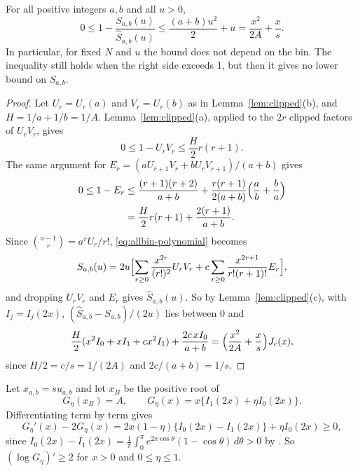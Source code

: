 \begin{theorem}\label{thm:allbin-bessel}
For all positive integers $a,b$ and all $u>0$,
\begin{equation}\label{eq:allbin-bessel}
 0\le 1-\frac{S_{a,b}(u)}{\widehat S_{a,b}(u)}
 \le \frac{(a+b)u^2}{2}+u
 =\frac{x^2}{2A}+\frac xs.
\end{equation}
In particular, for fixed $N$ and $u$ the bound does not depend on the bin.
The inequality still holds when the right side exceeds 1, but then it
gives no lower bound on $S_{a,b}$.
\end{theorem}
\begin{proof}
Let $U_r=U_r(a)$ and $V_r=U_r(b)$ as in Lemma~\ref{lem:clipped}(b), and
$H=1/a+1/b=1/A$. Lemma~\ref{lem:clipped}(a), applied to the $2r$ clipped
factors of $U_rV_r$, gives
\begin{equation}\label{eq:allbin-odd-deficit}
 0\le1-U_rV_r\le\frac H2r(r+1).
\end{equation}
The same argument for $E_r=(aU_{r+1}V_r+bU_rV_{r+1})/(a+b)$ gives
\begin{align}
 0\le1-E_r
 &\le\frac{(r+1)(r+2)}{a+b}
 +\frac{r(r+1)}{2(a+b)}\Bigl(\frac ab+\frac ba\Bigr)\notag\\
 &=\frac H2r(r+1)+\frac{2(r+1)}{a+b}.\label{eq:allbin-even-deficit}
\end{align}
Since $\binom{a-1}r=a^rU_r/r!$, \eqref{eq:allbin-polynomial} becomes
\begin{equation}\label{eq:allbin-normalized-series}
 S_{a,b}(u)=2u\Bigl[
 \sum_{r\ge0}\frac{x^{2r}}{(r!)^2}U_rV_r
 +c\sum_{r\ge0}\frac{x^{2r+1}}{r!(r+1)!}E_r\Bigr],
\end{equation}
and dropping $U_rV_r$ and $E_r$ gives $\widehat S_{a,b}(u)$. So by
Lemma~\ref{lem:clipped}(c), with $I_j=I_j(2x)$,
$(\widehat S_{a,b}-S_{a,b})/(2u)$ lies between $0$ and
\[
 \frac H2(x^2I_0+xI_1+cx^2I_1)+\frac{2c\,xI_0}{a+b}
 =\Bigl(\frac{x^2}{2A}+\frac xs\Bigr)J_c(x),
\]
since $H/2=c/s=1/(2A)$ and $2c/(a+b)=1/s$.
\end{proof}

Let $x_{a,b}=su_{a,b}$ and let $x_B$ be the positive root of
\begin{equation}\label{eq:allbin-bessel-root}
 G_\eta(x_B)=A,\qquad
 G_\eta(x)=x\{I_1(2x)+\eta I_0(2x)\}.
\end{equation}
Differentiating term by term gives
\begin{equation}\label{eq:allbin-logderivative}
 G_\eta'(x)-2G_\eta(x)
 =2x(1-\eta)\{I_0(2x)-I_1(2x)\}+\eta I_0(2x)\ge0,
\end{equation}
since $I_0(2x)-I_1(2x)=\frac1\pi\int_0^\pi e^{2x\cos\theta}(1-\cos\theta)\,d\theta>0$
by \cite[Eq.~10.32.3]{dlmf}. So $(\log G_\eta)'\ge2$ for $x>0$ and
$0\le\eta\le1$.

